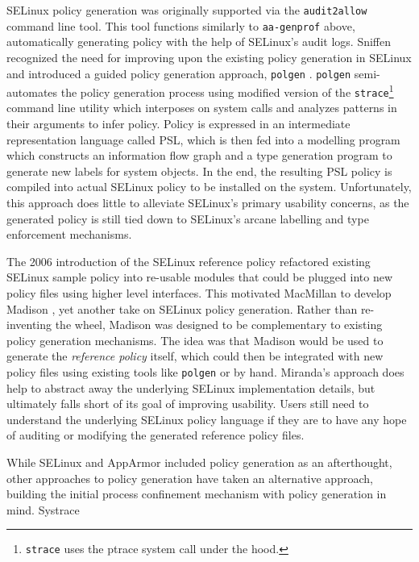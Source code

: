 \documentclass[dvipsnames, 12pt]{article}
\begin{document}
SELinux policy generation was originally supported via the \texttt{audit2allow}
\cite{audit2allow} command line tool. This tool functions similarly to
\texttt{aa-genprof} \cite{aa_genprof} above, automatically generating policy
with the help of SELinux's audit logs. Sniffen \etal recognized the need for
improving upon the existing policy generation in SELinux and introduced a guided
policy generation approach, \texttt{polgen} \cite{sniffen06_guided}.
\texttt{polgen} semi-automates the policy generation process using modified
version of the \texttt{strace}\footnote{\texttt{strace} uses the ptrace system
call under the hood.} command line utility which interposes on system calls and
analyzes patterns in their arguments to infer policy. Policy is expressed in an
intermediate representation language called PSL, which is then fed into
a modelling program which constructs an information flow graph and a type
generation program to generate new labels for system objects. In the end, the
resulting PSL policy is compiled into actual SELinux policy to be installed on
the system. Unfortunately, this approach does little to alleviate SELinux's
primary usability concerns, as the generated policy is still tied down to
SELinux's arcane labelling and type enforcement mechanisms.

The 2006 introduction of the SELinux reference policy \cite{pebenito2006_refpol}
refactored existing SELinux sample policy into re-usable modules that could be
plugged into new policy files using higher level interfaces. This motivated
MacMillan to develop Madison \cite{macmillan07_madison}, yet another take on
SELinux policy generation. Rather than re-inventing the wheel, Madison was
designed to be complementary to existing policy generation mechanisms. The idea
was that Madison would be used to generate the \textit{reference policy} itself,
which could then be integrated with new policy files using existing tools like
\texttt{polgen} or by hand. Miranda's approach does help to abstract away the
underlying SELinux implementation details, but ultimately falls short of its
goal of improving usability. Users still need to understand the underlying
SELinux policy language if they are to have any hope of auditing or modifying
the generated reference policy files.


While SELinux and AppArmor included policy generation as an afterthought, other
approaches to policy generation have taken an alternative approach, building the
initial process confinement mechanism with policy generation in mind. Systrace
\cite{provos2003_systrace}
\end{document}
